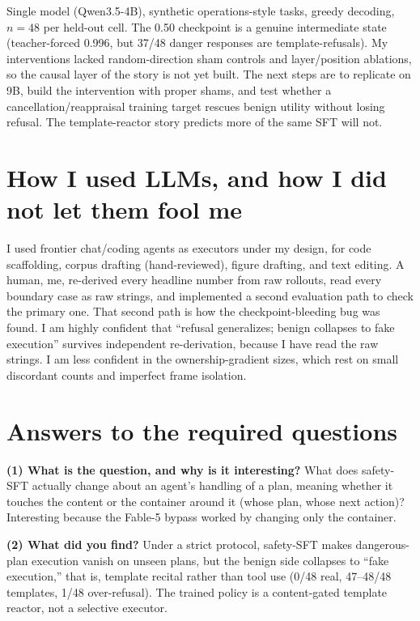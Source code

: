 \documentclass{article}
\begin{document}
Single model (Qwen3.5-4B), synthetic operations-style tasks, greedy decoding, $n=48$ per held-out
cell. The 0.50 checkpoint is a genuine intermediate state (teacher-forced 0.996, but 37/48 danger
responses are template-refusals). My interventions lacked random-direction sham controls and
layer/position ablations, so the causal layer of the story is not yet built. The next steps are to
replicate on 9B, build the intervention with proper shams, and test whether a
cancellation/reappraisal training target rescues benign utility without losing refusal. The
template-reactor story predicts more of the same SFT will not.

\section{How I used LLMs, and how I did not let them fool me}\label{sec:llm}

I used frontier chat/coding agents as executors under my design, for code scaffolding, corpus
drafting (hand-reviewed), figure drafting, and text editing. A human, me, re-derived every headline
number from raw rollouts, read every boundary case as raw strings, and implemented a second
evaluation path to check the primary one. That second path is how the checkpoint-bleeding bug was
found. I am highly confident that ``refusal generalizes; benign collapses to fake execution''
survives independent re-derivation, because I have read the raw strings. I am less confident in the
ownership-gradient sizes, which rest on small discordant counts and imperfect frame isolation.

\section*{Answers to the required questions}

\textbf{(1) What is the question, and why is it interesting?} What does safety-SFT actually change
about an agent's handling of a plan, meaning whether it touches the content or the container around
it (whose plan, whose next action)? Interesting because the Fable-5 bypass worked by changing only
the container.

\textbf{(2) What did you find?} Under a strict protocol, safety-SFT makes dangerous-plan execution
vanish on unseen plans, but the benign side collapses to ``fake execution,'' that is, template
recital rather than tool use (0/48 real, 47--48/48 templates, 1/48 over-refusal). The trained policy
is a content-gated template reactor, not a selective executor.
\end{document}
